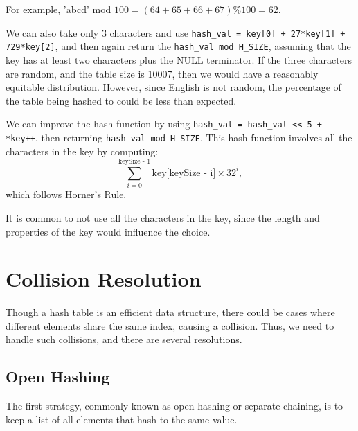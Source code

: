 For example, 'abcd' mod \(100 = (64 + 65 + 66 + 67) \% 100 = 62\). 

We can also take only 3 characters and use \verb|hash_val = key[0] + 27*key[1] + 729*key[2]|, and then again return the \verb|hash_val mod H_SIZE|, assuming that the key has at least two characters plus the NULL terminator. If the three characters are random, and the table size is 10007, then we would have a reasonably equitable distribution. However, since English is not random, the percentage of the table being hashed to could be less than expected. 

We can improve the hash function by using \verb|hash_val = hash_val << 5 + *key++|, then returning \verb|hash_val mod H_SIZE|. This hash function involves all the characters in the key by computing:
\[
  \sum_{i = 0}^{\text{keySize - 1}} \text{key[keySize - i]} \times 32^{i},
\]
which follows Horner's Rule.

It is common to not use all the characters in the key, since the length and properties of the key would influence the choice.

\section{Collision Resolution}
Though a hash table is an efficient data structure, there could be cases where different elements share the same index, causing a collision. Thus, we need to handle such collisions, and there are several resolutions.

\subsection{Open Hashing}
The first strategy, commonly known as open hashing or separate chaining, is to keep a list of all elements that hash to the same value.

